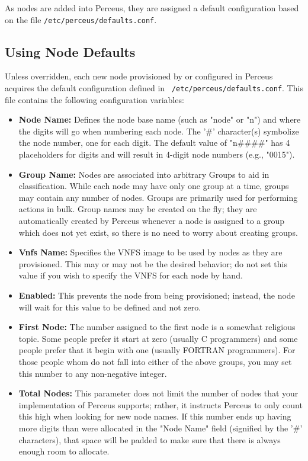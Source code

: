 \documentclass[10pt,letterpaper]{report}
\begin{document}
As nodes are added into Perceus, they are assigned a default configuration
based on the file {\tt /etc/perceus/defaults.conf}.

\subsection{Using Node Defaults}

Unless overridden, each new node provisioned by or configured in Perceus
acquires the default configuration defined in {\tt
/etc/perceus/defaults.conf}.  This file contains the following configuration
variables:

\begin{itemize}

\item {\bf Node Name:}  Defines the node base name (such as "node" or "n") and
where the digits will go when numbering each node.  The
'\#' character(s) symbolize the node number, one for each digit.  The default
value of "n\#\#\#\#" has 4 placeholders for digits and will result in 4-digit
node numbers (e.g., "0015").

\item {\bf Group Name:}  Nodes are associated into arbitrary Groups to aid in
classification.  While each node may have only one group at a time, groups may
contain any number of nodes.  Groups are primarily used for performing actions
in bulk.  Group names may be created on the fly; they are automatically
created by Perceus whenever a node is assigned to a group which does not yet
exist, so there is no need to worry about creating groups.

\item {\bf Vnfs Name:}  Specifies the VNFS image to be used by nodes as they
are provisioned.  This may or may not be the desired behavior; do not set this
value if you wish to specify the VNFS for each node by hand.

\item {\bf Enabled:}  This prevents the node from being provisioned; instead,
the node will wait for this value to be defined and not zero.

\item {\bf First Node:}  The number assigned to the first node is a somewhat
religious topic. Some people prefer it start at zero (usually C programmers)
and some people prefer that it begin with one (usually FORTRAN programmers).
For those people whom do not fall into either of the above groups, you may set
this number to any non-negative integer.

\item {\bf Total Nodes:}  This parameter does not limit the number of nodes
that your implementation of Perceus supports; rather, it instructs Perceus to
only count this high when looking for new node names.  If this number ends up
having more digits than were allocated in the "Node Name" field (signified by
the '\#' characters), that space will be padded to make sure that there is
always enough room to allocate.

\end{itemize}
\end{document}
